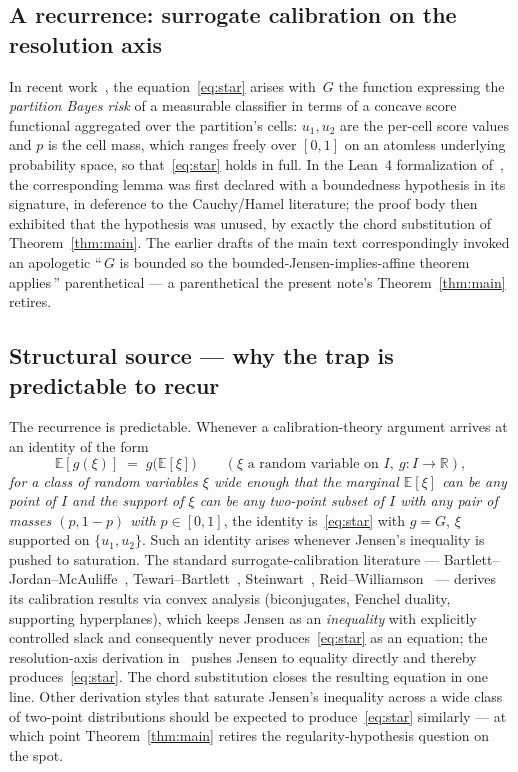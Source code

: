 \documentclass[11pt,a4paper]{amsart}
\newcommand{\R}{\mathbb R}
\newcommand{\E}{\mathbb E}
\begin{document}
\subsection{A recurrence: surrogate calibration on the resolution axis}
\label{ssec:recurrence}

In recent work~\cite{El1,El2}, the equation~\eqref{eq:star} arises with~$G$
the function expressing the \emph{partition Bayes risk} of a measurable
classifier in terms of a concave score functional aggregated over the
partition's cells: $u_1,u_2$ are the per-cell score values and $p$ is the
cell mass, which ranges freely over $[0,1]$ on an atomless underlying
probability space, so that~\eqref{eq:star} holds in full. In the Lean~4
formalization of~\cite{El2}, the corresponding lemma was first declared
with a boundedness hypothesis in its signature, in deference to the
Cauchy/Hamel literature; the proof body then exhibited that the hypothesis
was unused, by exactly the chord substitution of Theorem~\ref{thm:main}.
The earlier drafts of the main text correspondingly invoked an apologetic
``\,$G$ is bounded so the bounded-Jensen-implies-affine theorem
applies\,'' parenthetical --- a parenthetical the present note's
Theorem~\ref{thm:main} retires.

\subsection{Structural source --- why the trap is predictable to recur}
\label{ssec:structural}

The recurrence is predictable. Whenever a calibration-theory argument
arrives at an identity of the form
\[
\E[g(\xi)] \;=\; g\bigl(\E[\xi]\bigr)
\qquad (\xi \text{ a random variable on } I,\ g\colon I\to\R),
\]
\emph{for a class of random variables $\xi$ wide enough that the marginal
$\E[\xi]$ can be any point of $I$ and the support of $\xi$ can be any
two-point subset of $I$ with any pair of masses $(p,1-p)$ with $p\in[0,1]$},
the identity is~\eqref{eq:star} with $g=G$, $\xi$ supported on
$\{u_1,u_2\}$. Such an identity arises whenever Jensen's inequality is
pushed to saturation. The standard surrogate-calibration literature ---
Bartlett--Jordan--McAuliffe~\cite{BJM2006},
Tewari--Bartlett~\cite{TewariBartlett2007},
Steinwart~\cite{Steinwart2007}, Reid--Williamson~\cite{ReidWilliamson2010,
ReidWilliamson2011} --- derives its calibration results via convex
analysis (biconjugates, Fenchel duality, supporting hyperplanes), which
keeps Jensen as an \emph{inequality} with explicitly controlled slack and
consequently never produces~\eqref{eq:star} as an equation; the
resolution-axis derivation in~\cite{El2} pushes Jensen to equality directly
and thereby produces~\eqref{eq:star}. The chord substitution closes the
resulting equation in one line. Other derivation styles that saturate
Jensen's inequality across a wide class of two-point distributions should
be expected to produce~\eqref{eq:star} similarly --- at which point
Theorem~\ref{thm:main} retires the regularity-hypothesis question on the
spot.
\end{document}
